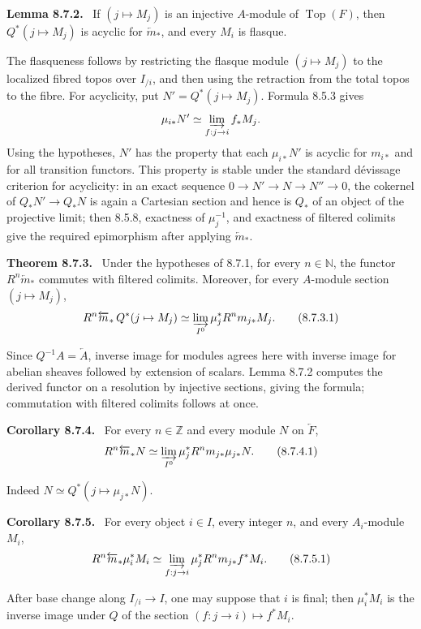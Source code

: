 \documentclass[11pt]{article}
\newcommand{\Top}{\operatorname{Top}}
\newcommand{\NN}{\mathbb{N}}
\newcommand{\ZZ}{\mathbb{Z}}
\newenvironment{statement}[1]{\par\medskip\noindent\textbf{#1.}\ }{\par\medskip}
\begin{document}
\begin{statement}{Lemma 8.7.2}
If \((j\mapsto M_j)\) is an injective \(A\)-module of \(\Top(F)\), then \(Q^*(j\mapsto M_j)\) is acyclic for \(\overleftarrow m_*\), and every \(M_i\) is flasque.
\end{statement}
The flasqueness follows by restricting the flasque module \((j\mapsto M_j)\) to the localized fibred topos over \(I_{/i}\), and then using the retraction from the total topos to the fibre. For acyclicity, put \(N'=Q^*(j\mapsto M_j)\). Formula 8.5.3 gives
\[
 \mu_{i*}N'\simeq\varinjlim_{f:j\to i}f_*M_j.
\]
Using the hypotheses, \(N'\) has the property that each \(\mu_{i*}N'\) is acyclic for \(m_{i*}\) and for all transition functors. This property is stable under the standard dévissage criterion for acyclicity: in an exact sequence \(0\to N'\to N\to N''\to0\), the cokernel of \(Q_*N'\to Q_*N\) is again a Cartesian section and hence is \(Q_*\) of an object of the projective limit; then 8.5.8, exactness of \(\mu_j^{-1}\), and exactness of filtered colimits give the required epimorphism after applying \(\overleftarrow m_*\).

\begin{statement}{Theorem 8.7.3}
Under the hypotheses of 8.7.1, for every \(n\in\NN\), the functor \(R^n\overleftarrow m_*\) commutes with filtered colimits. Moreover, for every \(A\)-module section \((j\mapsto M_j)\),
\[
 R^n\overleftarrow m_*\, Q^*(j\mapsto M_j)
 \simeq
 \varinjlim_{I^0}\mu_j^*R^nm_{j*}M_j. \tag{8.7.3.1}
\]
\end{statement}
Since \(Q^{-1}A=\overleftarrow A\), inverse image for modules agrees here with inverse image for abelian sheaves followed by extension of scalars. Lemma 8.7.2 computes the derived functor on a resolution by injective sections, giving the formula; commutation with filtered colimits follows at once.

\begin{statement}{Corollary 8.7.4}
For every \(n\in\ZZ\) and every module \(N\) on \(\overleftarrow F\),
\[
 R^n\overleftarrow m_*N
 \simeq
 \varinjlim_{I^0}\mu_j^*R^nm_{j*}\mu_{j*}N. \tag{8.7.4.1}
\]
\end{statement}
Indeed \(N\simeq Q^*(j\mapsto\mu_{j*}N)\).

\begin{statement}{Corollary 8.7.5}
For every object \(i\in I\), every integer \(n\), and every \(A_i\)-module \(M_i\),
\[
 R^n\overleftarrow m_*\mu_i^*M_i
 \simeq
 \varinjlim_{f:j\to i}\mu_j^*R^nm_{j*}f^*M_i. \tag{8.7.5.1}
\]
\end{statement}
After base change along \(I_{/i}\to I\), one may suppose that \(i\) is final; then \(\mu_i^*M_i\) is the inverse image under \(Q\) of the section \((f:j\to i)\mapsto f^*M_i\).
\end{document}
